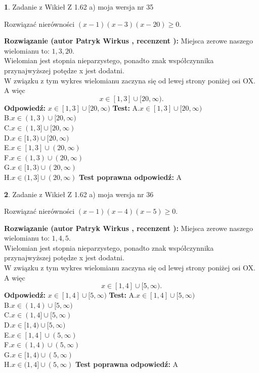 \documentclass[12pt, a4paper]{article}
\theoremstyle{definition} %
\newtheorem{zad}{}
\newcommand{\zadStart}[1]{\begin{zad}#1\newline}
\newcommand{\zadStop}{\end{zad}}
\newcommand{\rozwStart}[2]{\noindent \textbf{Rozwiązanie (autor #1 , recenzent #2): }\newline}
\newcommand{\rozwStop}{\newline}
\newcommand{\odpStart}{\noindent \textbf{Odpowiedź:}\newline}
\newcommand{\odpStop}{\newline}
\newcommand{\testStart}{\noindent \textbf{Test:}\newline}
\newcommand{\testStop}{\newline}
\newcommand{\kluczStart}{\noindent \textbf{Test poprawna odpowiedź:}\newline}
\newcommand{\kluczStop}{\newline}
\begin{document}
\zadStart{Zadanie z Wikieł Z 1.62 a) moja wersja nr 35}

Rozwiązać nierówności $(x-1)(x-3)(x-20)\ge0$.
\zadStop
\rozwStart{Patryk Wirkus}{}
Miejsca zerowe naszego wielomianu to: $1, 3, 20$.\\
Wielomian jest stopnia nieparzystego, ponadto znak współczynnika przy\linebreak najwyższej potędze x jest dodatni.\\ W związku z tym wykres wielomianu zaczyna się od lewej strony poniżej osi OX. A więc $$x \in [1,3] \cup [20,\infty).$$
\rozwStop
\odpStart
$x \in [1,3] \cup [20,\infty)$
\odpStop
\testStart
A.$x \in [1,3] \cup [20,\infty)$\\
B.$x \in (1,3) \cup [20,\infty)$\\
C.$x \in (1,3] \cup [20,\infty)$\\
D.$x \in [1,3) \cup [20,\infty)$\\
E.$x \in [1,3] \cup (20,\infty)$\\
F.$x \in (1,3) \cup (20,\infty)$\\
G.$x \in [1,3) \cup (20,\infty)$\\
H.$x \in (1,3] \cup (20,\infty)$
\testStop
\kluczStart
A
\kluczStop



\zadStart{Zadanie z Wikieł Z 1.62 a) moja wersja nr 36}

Rozwiązać nierówności $(x-1)(x-4)(x-5)\ge0$.
\zadStop
\rozwStart{Patryk Wirkus}{}
Miejsca zerowe naszego wielomianu to: $1, 4, 5$.\\
Wielomian jest stopnia nieparzystego, ponadto znak współczynnika przy\linebreak najwyższej potędze x jest dodatni.\\ W związku z tym wykres wielomianu zaczyna się od lewej strony poniżej osi OX. A więc $$x \in [1,4] \cup [5,\infty).$$
\rozwStop
\odpStart
$x \in [1,4] \cup [5,\infty)$
\odpStop
\testStart
A.$x \in [1,4] \cup [5,\infty)$\\
B.$x \in (1,4) \cup [5,\infty)$\\
C.$x \in (1,4] \cup [5,\infty)$\\
D.$x \in [1,4) \cup [5,\infty)$\\
E.$x \in [1,4] \cup (5,\infty)$\\
F.$x \in (1,4) \cup (5,\infty)$\\
G.$x \in [1,4) \cup (5,\infty)$\\
H.$x \in (1,4] \cup (5,\infty)$
\testStop
\kluczStart
A
\kluczStop
\end{document}
